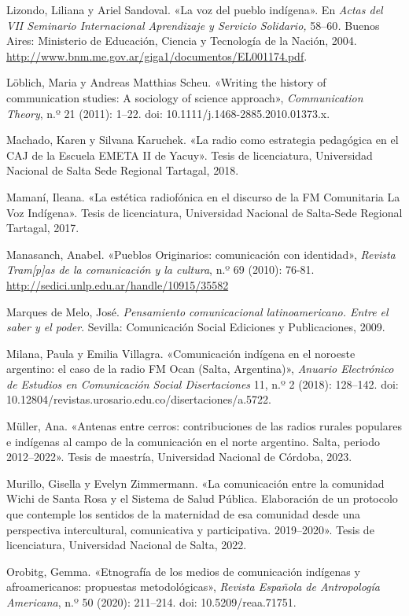 \documentclass{tufte-handout}
\begin{document}
\begin{hangparas}{.25in}{1}
Lizondo, Liliana y Ariel Sandoval. «La voz del pueblo indígena». En
\emph{Actas del VII Seminario Internacional Aprendizaje y Servicio
Solidario,} 58--60\emph{.} Buenos Aires: Ministerio de Educación,
Ciencia y Tecnología de la Nación, 2004.
\url{http://www.bnm.me.gov.ar/giga1/documentos/EL001174.pdf}.

Löblich, Maria y Andreas Matthias Scheu. «Writing the history of
communication studies: A sociology of science approach»,
\emph{Communication Theory}, n.º 21 (2011): 1--22. doi:
10.1111/j.1468-2885.2010.01373.x.

Machado, Karen y Silvana Karuchek. «La radio como estrategia pedagógica
en el CAJ de la Escuela EMETA II de Yacuy». Tesis de licenciatura,
Universidad Nacional de Salta Sede Regional Tartagal, 2018.

Mamaní, Ileana. «La estética radiofónica en el discurso de la FM
Comunitaria La Voz Indígena». Tesis de licenciatura, Universidad
Nacional de Salta-Sede Regional Tartagal, 2017.

Manasanch, Anabel. «Pueblos Originarios: comunicación con identidad»,
\emph{Revista Tram{[}p{]}as de la comunicación y la cultura}, n.º 69
(2010): 76-81. \url{http://sedici.unlp.edu.ar/handle/10915/35582}

Marques de Melo, José. \emph{Pensamiento comunicacional latinoamericano.
Entre el saber y el poder}. Sevilla: Comunicación Social Ediciones y
Publicaciones, 2009.

Milana, Paula y Emilia Villagra. «Comunicación indígena en el noroeste
argentino: el caso de la radio FM Ocan (Salta, Argentina)»,
\emph{Anuario Electrónico de Estudios en Comunicación Social
Disertaciones} 11, n.º 2 (2018): 128--142. doi:
10.12804/revistas.urosario.edu.co/disertaciones/a.5722.

Müller, Ana. «Antenas entre cerros: contribuciones de las radios rurales
populares e indígenas al campo de la comunicación en el norte argentino.
Salta, periodo 2012--2022». Tesis de maestría, Universidad Nacional de
Córdoba, 2023.

Murillo, Gisella y Evelyn Zimmermann. «La comunicación entre la
comunidad Wichi de Santa Rosa y el Sistema de Salud Pública. Elaboración
de un protocolo que contemple los sentidos de la maternidad de esa
comunidad desde una perspectiva intercultural, comunicativa y
participativa. 2019--2020». Tesis de licenciatura, Universidad Nacional
de Salta, 2022.

Orobitg, Gemma. «Etnografía de los medios de comunicación indígenas y
afroamericanos: propuestas metodológicas», \emph{Revista Española de
Antropología Americana}, n.º 50 (2020): 211--214. doi:
10.5209/reaa.71751.


\end{hangparas}
\end{document}
